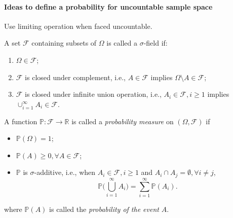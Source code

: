 \paragraph{Ideas to define a probability for uncountable sample space}
Use limiting operation when faced uncountable.



\begin{definition}
A set $\mathcal{F}$ containing subsets of $\Omega$ is called a $\sigma$-field if:
\begin{enumerate}
\item
$\Omega\in\mathcal{F}$;
\item
$\mathcal{F}$ is closed under complement, i.e., 
$A\in\mathcal{F}$ implies $\Omega\setminus A\in\mathcal{F}$;
\item
$\mathcal{F}$ is closed under infinite union operation, i.e.,
$A_i\in\mathcal{F},i\ge1$ implies $\cup_{i=1}^\infty A_i\in\mathcal{F}$.
\end{enumerate}
\end{definition}

\begin{definition}
A function $\mathbb{P}:\mathcal{F}\to\mathbb{R}$ is called a \emph{probability measure} on $(\Omega,\mathcal{F})$ if
\begin{itemize}
\item
$\mathbb{P}(\Omega)=1$;
\item
$\mathbb{P}(A)\ge0,\forall A\in\mathcal{F}$;
\item
$\mathbb{P}$ is $\sigma$-additive, i.e., when $A_i\in\mathcal{F},i\ge1$ and $A_i\cap A_j=\emptyset,\forall i\ne j$, 
\[
\mathbb{P}\bigg(
\bigcup_{i=1}^\infty A_i
\bigg)
=
\sum_{i=1}^\infty\mathbb{P}(A_i).
\]
\end{itemize}
where $\mathbb{P}(A)$ is called the \emph{probability of the event} $A$.
\end{definition}

